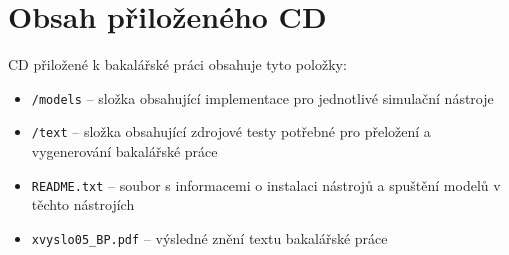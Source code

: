 \chapter{Obsah přiloženého CD}
CD přiložené k bakalářské práci obsahuje tyto položky:

\begin{itemize}
    \item \texttt{/models} -- složka obsahující implementace pro jednotlivé simulační nástroje
    \item \texttt{/text} -- složka obsahující zdrojové testy potřebné pro přeložení a vygenerování bakalářské práce
    \item \texttt{README.txt} -- soubor s informacemi o instalaci nástrojů a spuštění modelů v těchto nástrojích
    \item \texttt{xvyslo05\_BP.pdf} -- výsledné znění textu bakalářské práce
\end{itemize}
